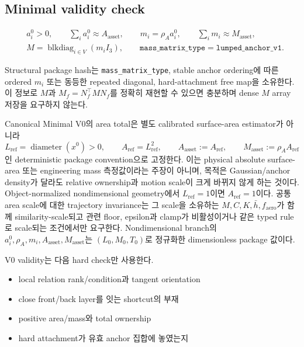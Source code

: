 \documentclass[11pt]{article}
\begin{document}
\subsection{Minimal validity check}

\begin{equation}
\begin{aligned}
  &a_i^0>0,\qquad
  \sum_i a_i^0 \approx A_{\mathrm{asset}},\qquad
  m_i=\rho_A a_i^0,\qquad
  \sum_i m_i \approx M_{\mathrm{asset}},\\
  &M=\operatorname{blkdiag}_{i\in V}(m_i I_3),\qquad
  \texttt{mass\_matrix\_type}=\texttt{lumped\_anchor\_v1}.
\end{aligned}
  \label{eq:minimal-area-mass}
\end{equation}

Structural package hash는 \texttt{mass\_matrix\_type}, stable anchor ordering에 따른 ordered
\(m_i\) 또는 동등한 repeated diagonal, hard-attachment free map을 소유한다. 이 정보로 \(M\)과
\(M_f=N_f^\top MN_f\)를 정확히 재현할 수 있으면 충분하며 dense \(M\) array 저장을 요구하지 않는다.

Canonical Minimal V0의 area total은 별도 calibrated surface-area estimator가 아니라
\[
  L_{\mathrm{ref}}=\operatorname{diameter}(x^0)>0,\qquad
  A_{\mathrm{ref}}=L_{\mathrm{ref}}^2,\qquad
  A_{\mathrm{asset}}:=A_{\mathrm{ref}},\qquad
  M_{\mathrm{asset}}:=\rho_AA_{\mathrm{ref}}
\]
인 deterministic package convention으로 고정한다. 이는 physical absolute surface-area 또는
engineering mass 측정값이라는 주장이 아니며, 목적은 Gaussian/anchor density가 달라도 relative
ownership과 motion scale이 크게 바뀌지 않게 하는 것이다. Object-normalized nondimensional geometry에서
\(L_{\mathrm{ref}}=1\)이면 \(A_{\mathrm{ref}}=1\)이다. 공통 area scale에 대한 trajectory invariance는
그 scale을 소유하는 \(M,C,K,\bar h,f_{\mathrm{aero}}\)가 함께 similarity-scale되고
관련 floor, epsilon과 clamp가 비활성이거나 같은 typed rule로 scale되는 조건에서만 요구한다.
Nondimensional branch의 \(a_i^0,\rho_A,m_i,A_{\mathrm{asset}},M_{\mathrm{asset}}\)는
\((L_0,M_0,T_0)\)로 정규화한 dimensionless package 값이다.

V0 validity는 다음 hard check만 사용한다.

\begin{itemize}
  \item local relation rank/condition과 tangent orientation
  \item close front/back layer를 잇는 shortcut의 부재
  \item positive area/mass와 total ownership
  \item hard attachment가 유효 anchor 집합에 놓였는지
\end{itemize}
\end{document}
